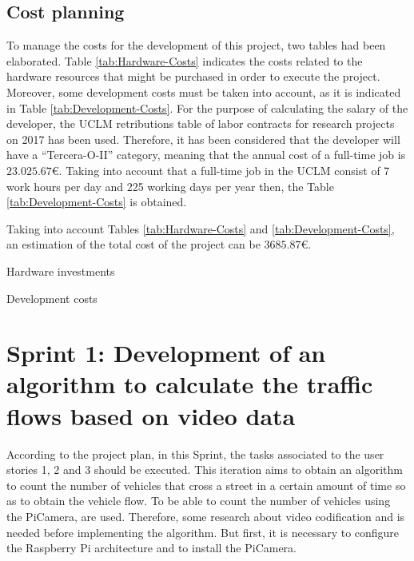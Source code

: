 \subsection{Cost planning}
To manage the costs for the development of this project, two tables had been elaborated. Table \ref{tab:Hardware-Costs} indicates the costs related to the hardware resources that might be purchased in order to execute the project. Moreover, some development costs must be taken into account, as it is indicated in Table \ref{tab:Development-Costs}. For the purpose of calculating the salary of the developer, the \ac{UCLM} retributions table of labor contracts for research projects on 2017 has been used. Therefore, it has been considered that the developer will have a “Tercera-O-II” category, meaning that the annual cost of a full-time job is $23.025.67$\euro{}. Taking into account that a full-time job in the UCLM consist of 7 work hours per day and 225 working days per year then, the Table \ref{tab:Development-Costs} is obtained. 

Taking into account Tables \ref{tab:Hardware-Costs} and \ref{tab:Development-Costs}, an estimation of the total cost of the project can be $3685.87$\euro{}.

\begin{table}[hp]
	\centering
	{\small
		
	}
	\caption{Hardware investments}
	\label{tab:Hardware-Costs}
\end{table}

\begin{table}[hp]
	\centering
	{\small
		
	}
	\caption{Development costs}
	\label{tab:Development-Costs}
\end{table}


\newpage
\section{Sprint 1: Development of an algorithm to calculate the traffic flows based on video data}
\label{Section:Sprint1}
According to the project plan, in this Sprint, the tasks associated to the user stories 1, 2 and 3 should be executed. This iteration aims to obtain an algorithm to count the number of vehicles that cross a street in a certain amount of time so as to obtain the vehicle flow. To be able to count the number of vehicles using the PiCamera,  are used. Therefore, some research about video codification and  is needed before implementing the algorithm. But first, it is necessary to configure the Raspberry Pi architecture and to install the PiCamera. 

